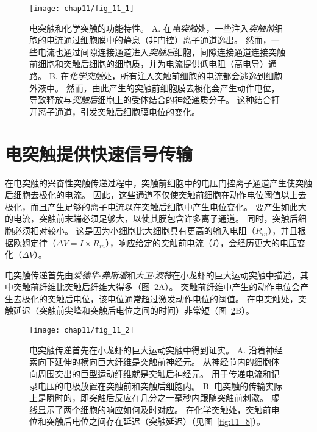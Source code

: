 \begin{figure}[htbp]
	\centering
	\texttt{[image: chap11/fig\_11\_1]}
	\caption{电突触和化学突触的功能特性。
		A. 在\textit{电突触}处，一些注入\textit{突触前}细胞的电流通过细胞膜中的静息（非门控）离子通道逸出。
		然而，一些电流也通过间隙连接通道进入\textit{突触后}细胞，间隙连接通道连接突触前细胞和突触后细胞的细胞质，并为电流提供低电阻（高电导）通路。
		B. 在\textit{化学突触}处，所有注入突触前细胞的电流都会逃逸到细胞外液中。
		然而，由此产生的突触前细胞膜去极化会产生动作电位，导致释放与\textit{突触后}细胞上的受体结合的神经递质分子。
		这种结合打开离子通道，引发突触后细胞膜电位的变化。}
	\label{fig:11_1}
\end{figure}


\section{电突触提供快速信号传输}

在电突触的兴奋性突触传递过程中，突触前细胞中的电压门控离子通道产生使突触后细胞去极化的电流。
因此，这些通道不仅使突触前细胞在动作电位阈值以上去极化，而且产生足够的离子电流以在突触后细胞中产生电位变化。
要产生如此大的电流，突触前末端必须足够大，以使其膜包含许多离子通道。
同时，突触后细胞必须相对较小。
这是因为小细胞比大细胞具有更高的输入电阻（$R_{in}$），并且根据欧姆定律（$\Delta V = I \times R_{in}$），响应给定的突触前电流（$I$），会经历更大的电压变化（$\Delta V$）。


电突触传递首先由\textit{爱德华$\cdot$弗斯潘}和\textit{大卫$\cdot$波特}在小龙虾的巨大运动突触中描述，其中突触前纤维比突触后纤维大得多（图~\ref{fig:11_2}A）。
突触前纤维中产生的动作电位会产生去极化的突触后电位，该电位通常超过激发动作电位的阈值。
在电突触处，突触延迟（突触前尖峰和突触后电位之间的时间）非常短（图~\ref{fig:11_2}B）。


\begin{figure}[htbp]
	\centering
	\texttt{[image: chap11/fig\_11\_2]}
	\caption{电突触传递首先在小龙虾的巨大运动突触中得到证实\cite{furshpan1959transmission,furshpan1957mechanism}。 
		A. 沿着神经索向下延伸的横向巨大纤维是突触前神经元。
		从神经节内的细胞体向周围突出的巨型运动纤维就是突触后神经元。
		用于传递电流和记录电压的电极放置在突触前和突触后细胞内。
		B. 电突触的传输实际上是瞬时的，即突触后反应在几分之一毫秒内跟随突触前刺激。
		虚线显示了两个细胞的响应如何及时对应。
		在化学突触处，突触前电位和突触后电位之间存在延迟（突触延迟）（见图~\ref{fig:11_8}）。}
	\label{fig:11_2}
\end{figure}



